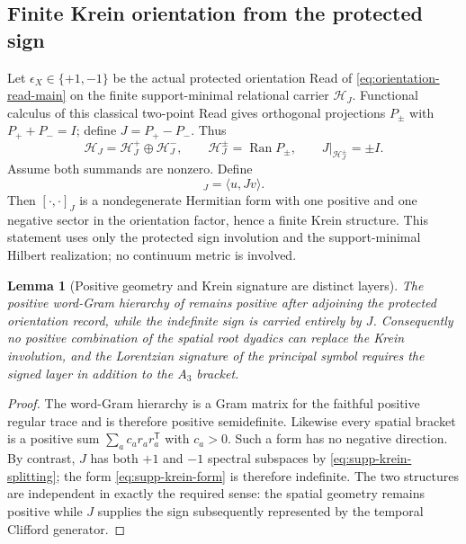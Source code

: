 \documentclass[11pt]{article}
\newtheorem{lemma}[lemma]{Lemma}
\theoremstyle{definition}
\theoremstyle{remark}
\newcommand{\Ran}{\operatorname{Ran}}
\begin{document}
\subsection{Finite Krein orientation from the protected sign}

Let $\epsilon_X\in\{+1,-1\}$ be the actual protected orientation Read of
\eqref{eq:orientation-read-main} on the finite support-minimal relational
carrier $\mathcal H_J$.  Functional calculus of this classical two-point Read
gives orthogonal projections $P_\pm$ with $P_++P_-=I$; define
$J=P_+-P_-$.  Thus
\begin{equation}
 \mathcal H_J=\mathcal H_J^+\oplus\mathcal H_J^-,
 \qquad
 \mathcal H_J^\pm=\Ran P_\pm,
 \qquad
 J|_{\mathcal H_J^\pm}=\pm I.
 \label{eq:supp-krein-splitting}
\end{equation}
Assume both summands are nonzero.  Define
\begin{equation}
 [u,v]_J=\langle u,Jv\rangle.
 \label{eq:supp-krein-form}
\end{equation}
Then $[\cdot,\cdot]_J$ is a nondegenerate Hermitian form with one positive and one negative sector in the orientation factor, hence a finite Krein structure.  This statement uses only the protected sign involution and the support-minimal Hilbert realization; no continuum metric is involved.

\begin{lemma}[Positive geometry and Krein signature are distinct layers]
\label{lem:supp-positive-krein-distinct}
The positive word-Gram hierarchy of  remains positive after adjoining the protected orientation record, while the indefinite sign is carried entirely by $J$.  Consequently no positive combination of the spatial root dyadics can replace the Krein involution, and the Lorentzian signature of the principal symbol requires the signed layer in addition to the $A_3$ bracket.
\end{lemma}

\begin{proof}
The word-Gram hierarchy is a Gram matrix for the faithful positive regular trace and is therefore positive semidefinite.  Likewise every spatial bracket is a positive sum $\sum_a c_a r_ar_a^{\mathsf T}$ with $c_a>0$.  Such a form has no negative direction.  By contrast, $J$ has both $+1$ and $-1$ spectral subspaces by \eqref{eq:supp-krein-splitting}; the form \eqref{eq:supp-krein-form} is therefore indefinite.  The two structures are independent in exactly the required sense: the spatial geometry remains positive while $J$ supplies the sign subsequently represented by the temporal Clifford generator.
\end{proof}
\end{document}
